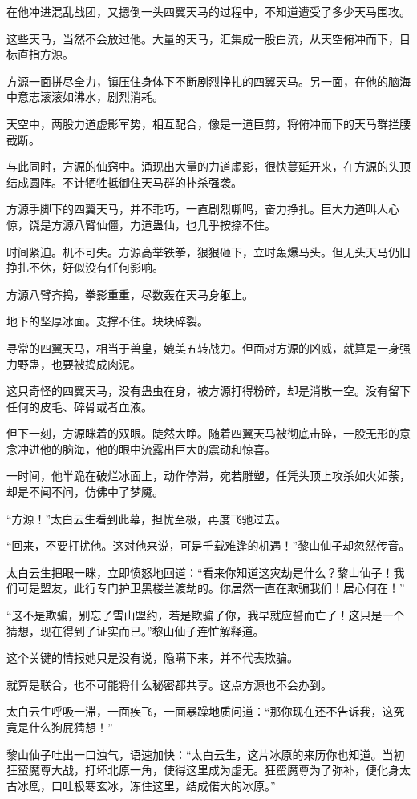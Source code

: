 \begin{this_body}
在他冲进混乱战团，又摁倒一头四翼天马的过程中，不知道遭受了多少天马围攻。

这些天马，当然不会放过他。大量的天马，汇集成一股白流，从天空俯冲而下，目标直指方源。

方源一面拼尽全力，镇压住身体下不断剧烈挣扎的四翼天马。另一面，在他的脑海中意志滚滚如沸水，剧烈消耗。

天空中，两股力道虚影军势，相互配合，像是一道巨剪，将俯冲而下的天马群拦腰截断。

与此同时，方源的仙窍中。涌现出大量的力道虚影，很快蔓延开来，在方源的头顶结成圆阵。不计牺牲抵御住天马群的扑杀强袭。

方源手脚下的四翼天马，并不乖巧，一直剧烈嘶鸣，奋力挣扎。巨大力道叫人心惊，饶是方源八臂仙僵，力道蛊仙，也几乎按捺不住。

时间紧迫。机不可失。方源高举铁拳，狠狠砸下，立时轰爆马头。但无头天马仍旧挣扎不休，好似没有任何影响。

方源八臂齐捣，拳影重重，尽数轰在天马身躯上。

地下的坚厚冰面。支撑不住。块块碎裂。

寻常的四翼天马，相当于兽皇，媲美五转战力。但面对方源的凶威，就算是一身强力野蛊，也要被捣成肉泥。

这只奇怪的四翼天马，没有蛊虫在身，被方源打得粉碎，却是消散一空。没有留下任何的皮毛、碎骨或者血液。

但下一刻，方源眯着的双眼。陡然大睁。随着四翼天马被彻底击碎，一股无形的意念冲进他的脑海，他的眼中流露出巨大的震动和惊喜。

一时间，他半跪在破烂冰面上，动作停滞，宛若雕塑，任凭头顶上攻杀如火如荼，却是不闻不问，仿佛中了梦魇。

“方源！”太白云生看到此幕，担忧至极，再度飞驰过去。

“回来，不要打扰他。这对他来说，可是千载难逢的机遇！”黎山仙子却忽然传音。

太白云生把眼一眯，立即愤怒地回道：“看来你知道这灾劫是什么？黎山仙子！我们可是盟友，此行专门护卫黑楼兰渡劫的。你居然一直在欺骗我们！居心何在！”

“这不是欺骗，别忘了雪山盟约，若是欺骗了你，我早就应誓而亡了！这只是一个猜想，现在得到了证实而已。”黎山仙子连忙解释道。

这个关键的情报她只是没有说，隐瞒下来，并不代表欺骗。

就算是联合，也不可能将什么秘密都共享。这点方源也不会办到。

太白云生呼吸一滞，一面疾飞，一面暴躁地质问道：“那你现在还不告诉我，这究竟是什么狗屁猜想！”

黎山仙子吐出一口浊气，语速加快：“太白云生，这片冰原的来历你也知道。当初狂蛮魔尊大战，打坏北原一角，使得这里成为虚无。狂蛮魔尊为了弥补，便化身太古冰凰，口吐极寒玄冰，冻住这里，结成偌大的冰原。”


\end{this_body}
